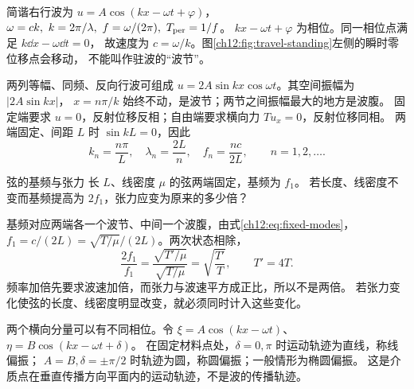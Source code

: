 简谐右行波为 $u=A\cos(kx-\omega t+\varphi)$，
$\omega=ck,\ k=2\pi/\lambda,\ f=\omega/(2\pi),\ T_{\rm per}=1/f$。
$kx-\omega t+\varphi$ 为相位。同一相位点满足 $k\dd x-\omega\dd t=0$，
故速度为 $c=\omega/k$。图\ref{ch12:fig:travel-standing}左侧的瞬时零位移点会移动，
不能叫作驻波的“波节”。

两列等幅、同频、反向行波可组成
$u=2A\sin kx\cos\omega t$。其空间振幅为 $|2A\sin kx|$，
$x=n\pi/k$ 始终不动，是波节；两节之间振幅最大的地方是波腹。
固定端要求 $u=0$，反射位移反相；自由端要求横向力 $Tu_x=0$，反射位移同相。
两端固定、间距 $L$ 时 $\sin kL=0$，因此
\begin{equation}
 k_n=\frac{n\pi}{L},\quad \lambda_n=\frac{2L}{n},\quad
 f_n=\frac{nc}{2L},\qquad n=1,2,\ldots.
 \label{ch12:eq:fixed-modes}
\end{equation}

\begin{center}
\label{ch12:fig:travel-standing}
\end{center}

\begin{origexamplebox}{弦的基频与张力}
\label{ch12:ex:02}
长 $L$、线密度 $\mu$ 的弦两端固定，基频为 $f_1$。
若长度、线密度不变而基频提高为 $2f_1$，张力应变为原来的多少倍？
\end{origexamplebox}
\begin{xesolution}
基频对应两端各一个波节、中间一个波腹，由式\eqref{ch12:eq:fixed-modes}，
$f_1=c/(2L)=\sqrt{T/\mu}/(2L)$。两次状态相除，
\[
 \frac{2f_1}{f_1}=\frac{\sqrt{T'/\mu}}{\sqrt{T/\mu}}
 =\sqrt{\frac{T'}T},\qquad \boxed{T'=4T}.
\]
频率加倍先要求波速加倍，而张力与波速平方成正比，所以不是两倍。
若张力变化使弦的长度、线密度明显改变，就必须同时计入这些变化。
\end{xesolution}

两个横向分量可以有不同相位。令
$\xi=A\cos(kx-\omega t)$、
$\eta=B\cos(kx-\omega t+\delta)$。
在固定材料点处，$\delta=0,\pi$ 时运动轨迹为直线，称线偏振；
$A=B,\delta=\pm\pi/2$ 时轨迹为圆，称圆偏振；一般情形为椭圆偏振。
这是介质点在垂直传播方向平面内的运动轨迹，不是波的传播轨迹。


